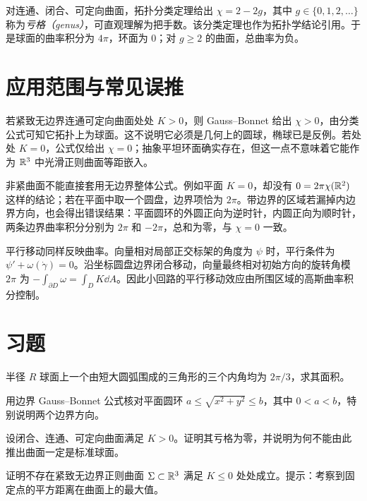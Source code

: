 对连通、闭合、可定向曲面，拓扑分类定理给出 $\chi=2-2g$，其中 $g\in\{0,1,2,\ldots\}$ 称为\emph{亏格（genus）}，可直观理解为把手数。该分类定理也作为拓扑学结论引用。于是球面的曲率积分为 $4\pi$，环面为 $0$；对 $g\ge2$ 的曲面，总曲率为负。

\section{应用范围与常见误推}
若紧致无边界连通可定向曲面处处 $K>0$，则 Gauss--Bonnet 给出 $\chi>0$，由分类公式可知它拓扑上为球面。这不说明它必须是几何上的圆球，椭球已是反例。若处处 $K=0$，公式仅给出 $\chi=0$；抽象平坦环面确实存在，但这一点不意味着它能作为 $\mathbb R^3$ 中光滑正则曲面等距嵌入。

非紧曲面不能直接套用无边界整体公式。例如平面 $K=0$，却没有 $0=2\pi\chi(\mathbb R^2)$ 这样的结论；若在平面中取一个圆盘，边界项恰为 $2\pi$。带边界的区域若漏掉内边界方向，也会得出错误结果：平面圆环的外圆正向为逆时针，内圆正向为顺时针，两条边界曲率积分分别为 $2\pi$ 和 $-2\pi$，总和为零，与 $\chi=0$ 一致。

平行移动同样反映曲率。向量相对局部正交标架的角度为 $\psi$ 时，平行条件为 $\psi'+\omega(\dot\gamma)=0$。沿坐标圆盘边界闭合移动，向量最终相对初始方向的旋转角模 $2\pi$ 为 $-\int_{\partial D}\omega=\int_DK\dd A$。因此小回路的平行移动效应由所围区域的高斯曲率积分控制。

\section{习题}
\begin{exercise}\label{ex:dg-gb-triangle}
半径 $R$ 球面上一个由短大圆弧围成的三角形的三个内角均为 $2\pi/3$，求其面积。
\end{exercise}
\begin{exercise}\label{ex:dg-gb-annulus}
用边界 Gauss--Bonnet 公式核对平面圆环 $a\le\sqrt{x^2+y^2}\le b$，其中 $0<a<b$，特别说明两个边界方向。
\end{exercise}
\begin{exercise}\label{ex:dg-gb-positive}
设闭合、连通、可定向曲面满足 $K>0$。证明其亏格为零，并说明为何不能由此推出曲面一定是标准球面。
\end{exercise}
\begin{exercise}\label{ex:dg-gb-flat-embedded}
证明不存在紧致无边界正则曲面 $\Sigma\subset\mathbb R^3$ 满足 $K\le0$ 处处成立。提示：考察到固定点的平方距离在曲面上的最大值。
\end{exercise}

